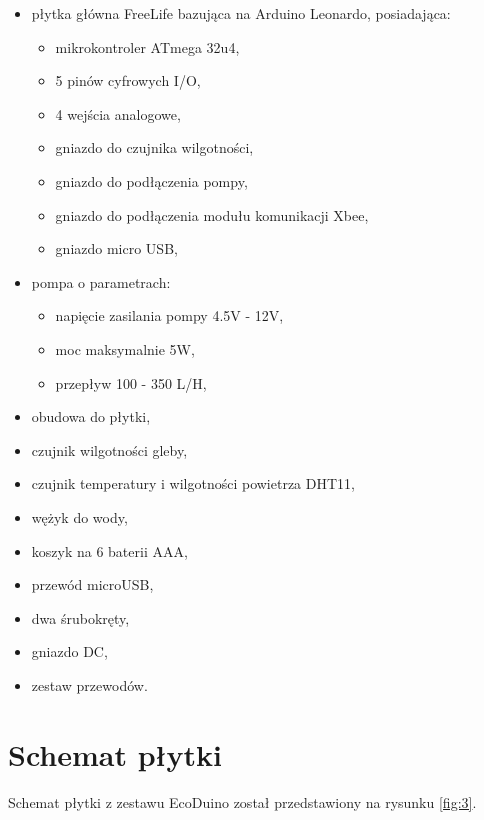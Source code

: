 \documentclass[a4paper,twoside,12pt]{book}
\begin{document}
\begin{itemize}
   \item płytka główna FreeLife bazująca na Arduino Leonardo, posiadająca:
         \begin{itemize}
            \item mikrokontroler ATmega 32u4,
            \item 5 pinów cyfrowych I/O,
            \item 4 wejścia analogowe,
            \item gniazdo do czujnika wilgotności,
            \item gniazdo do podłączenia pompy,
            \item gniazdo do podłączenia modułu komunikacji Xbee,
            \item gniazdo micro USB,
         \end{itemize}
   \item pompa o parametrach:
         \begin{itemize}
            \item napięcie zasilania pompy 4.5V - 12V,
            \item moc maksymalnie 5W,
            \item przepływ 100 - 350 L/H,
         \end{itemize}
   \item obudowa do płytki,
   \item czujnik wilgotności gleby,
   \item czujnik temperatury i wilgotności powietrza DHT11,
   \item wężyk do wody,
   \item koszyk na 6 baterii AAA,
   \item przewód microUSB,
   \item dwa śrubokręty,
   \item gniazdo DC,
   \item zestaw przewodów.
\end{itemize}

\section{Schemat płytki}

Schemat płytki z zestawu EcoDuino został przedstawiony na rysunku \ref{fig:3}.
\end{document}
